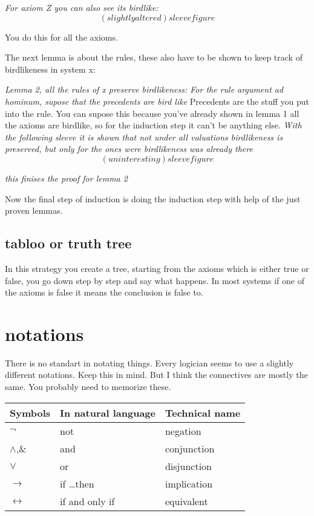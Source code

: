 \documentclass{article}
\begin{document}
\emph{For axiom Z you can also see its birdlike:}
\[(slightly altered) sleevefigure\]

You do this for all the axioms.

The next lemma is about the rules, these also have to be shown to keep
track of birdlikeness in system x:

\emph{Lemma 2, all the rules of x preserve birdlikeness:
	For the rule argument ad hominum, supose that the precedents
	are bird like
}
Precedents are the stuff you put into the rule.
You can supose this because you've already shown in lemma 1 all the axioms are
birdlike, so for the induction step it can't be anything else.
\emph{
	With the following sleeve it is shown that not under all valuations 
	birdlikeness is preserved, but only for the ones were birdlikeness was
	already there
}
\[(uninteresting) sleevefigure\]

\emph{this finises the proof for lemma 2}

Now the final step of induction is doing the induction step with help of the
just proven lemmas.

\subsection{tabloo or truth tree}
In this strategy you create a tree, starting from the axioms which is either
true or false, you go down step by step and say what happens. In most systems
if one of the axioms is false it means the conclusion is false to.

\section{notations}
\label{notations}
There is no standart in notating things. Every logician seems to use a
slightly different notations. Keep this in mind. But I think the connectives
are mostly the same. You probably need to memorize these.

\noindent
\begin{tabular}{@{}lll@{}}
Symbols&
In natural language &
Technical name \\ \toprule
$\neg$ 			& not 				& negation \\
$\wedge$,\& 	& and 				& conjunction \\
$\vee$ 			& or 				& disjunction\\
$\to$	& if \ldots then 	& implication\\
$\leftrightarrow$	& if and only if 	& equivalent\\ \bottomrule
\end{tabular}
\end{document}
